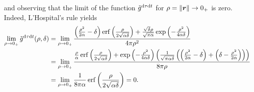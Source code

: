 \documentclass[a4paper,11pt]{article}
\begin{document}
and observing that the limit of the function $\tilde g^{{\mathrm{d}} \tau {\mathrm{d}} t}$ for $\rho = \| {{\bm{r}}}\| \rightarrow 0_+$ is zero. Indeed, L'Hospital's rule yields
\begin{align*}
	\lim_{\rho \rightarrow 0_+} \tilde g^{{\mathrm{d}} \tau {\mathrm{d}} t}(\rho,\delta) &=
	\lim_{\rho \rightarrow 0_+} \frac{
	\left(\frac{\rho^2}{2\alpha}-\delta \right) \operatorname{erf}\left(\frac{\rho}{2\sqrt{\alpha\delta}} \right)
	+ \frac{\sqrt{\delta} \rho}{\sqrt{\pi\alpha}} \exp \left( -\frac{\rho^2}{4 \alpha\delta} \right)}
	{4\pi \rho^2} \\ &= 
	\lim_{\rho \rightarrow 0_+} \frac{ \frac{\rho}{\alpha} \operatorname{erf}\left(\frac{\rho}{2\sqrt{\alpha\delta}}\right)
	+\exp\left(-\frac{\rho^2}{4\alpha\delta}\right) 
	\left( \frac{1}{\sqrt{\pi \alpha\delta}} \left(\left( \frac{\rho^2}{2\alpha} - \delta \right)
	+ \left( \delta - \frac{\rho^2}{2\alpha}\right) \right) \right)}
	{8 \pi \rho} \\
	&= \lim_{\rho \rightarrow 0_+}\frac{1}{8 \pi \alpha} \operatorname{erf}\bigg( \frac{\rho}{2\sqrt{\alpha\delta}} \bigg)  = 0.
\end{align*}
\end{document}

